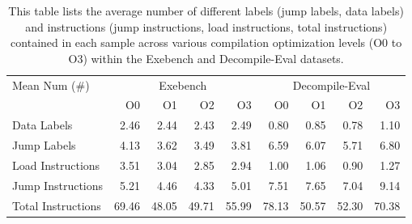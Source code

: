 \begin{table}[t]
\centering
\begin{tabular}{lrrrrrrrr}
\toprule
\multirow{2}{*}{Mean Num (\#)} & \multicolumn{4}{c}{Exebench}  & \multicolumn{4}{c}{Decompile-Eval} \\ \cmidrule(lr){2-5} \cmidrule(lr){6-9}
                         & O0    & O1    & O2    & O3    & O0      & O1     & O2     & O3     \\ \midrule
Data Labels              & 2.46  & 2.44  & 2.43  & 2.49  & 0.80    & 0.85   & 0.78   & 1.10   \\
Jump Labels              & 4.13  & 3.62  & 3.49  & 3.81  & 6.59    & 6.07   & 5.71   & 6.80   \\ \hdashline 
Load Instructions        & 3.51  & 3.04  & 2.85  & 2.94  & 1.00    & 1.06   & 0.90   & 1.27   \\ 
Jump Instructions        & 5.21  & 4.46  & 4.33  & 5.01  & 7.51    & 7.65   & 7.04   & 9.14   \\
Total Instructions       & 69.46 & 48.05 & 49.71 & 55.99 & 78.13   & 50.57  & 52.30  & 70.38  \\ \bottomrule
\end{tabular}
  \caption{This table lists the average number of different labels (jump labels, data labels) and instructions (jump instructions, load instructions, total instructions) contained in each sample across various compilation optimization levels (O0 to O3) within the Exebench and Decompile-Eval datasets.}
  \label{tab:dataset}
\end{table}